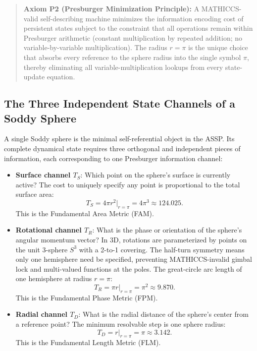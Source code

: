 \documentclass[11pt,a4paper]{article}
\begin{document}
\begin{quote}
\textbf{Axiom P2 (Presburger Minimization Principle):} A MATHICCS-valid self-describing machine minimizes the information encoding cost of persistent states subject to the constraint that all operations remain within Presburger arithmetic (constant multiplication by repeated addition; no variable-by-variable multiplication). The radius $r=\pi$ is the unique choice that absorbs every reference to the sphere radius into the single symbol $\pi$, thereby eliminating all variable-multiplication lookups from every state-update equation.
\end{quote}

\subsection{The Three Independent State Channels of a Soddy Sphere}

A single Soddy sphere is the minimal self-referential object in the ASSP. Its complete dynamical state requires three orthogonal and independent pieces of information, each corresponding to one Presburger information channel:

\begin{itemize}
  \item \textbf{Surface channel $T_S$}: Which point on the sphere's surface is currently active? The cost to uniquely specify any point is proportional to the total surface area:
    \[
      T_S = 4\pi r^2 \big|_{r=\pi} = 4\pi^3 \approx 124.025.
    \]
    This is the Fundamental Area Metric (FAM).
  \item \textbf{Rotational channel $T_R$}: What is the phase or orientation of the sphere's angular momentum vector? In 3D, rotations are parameterized by points on the unit 3-sphere $S^3$ with a 2-to-1 covering. The half-turn symmetry means only one hemisphere need be specified, preventing MATHICCS-invalid gimbal lock and multi-valued functions at the poles. The great-circle arc length of one hemisphere at radius $r=\pi$:
    \[
      T_R = \pi r \big|_{r=\pi} = \pi^2 \approx 9.870.
    \]
    This is the Fundamental Phase Metric (FPM).
  \item \textbf{Radial channel $T_D$}: What is the radial distance of the sphere's center from a reference point? The minimum resolvable step is one sphere radius:
    \[
      T_D = r \big|_{r=\pi} = \pi \approx 3.142.
    \]
    This is the Fundamental Length Metric (FLM).
\end{itemize}
\end{document}
